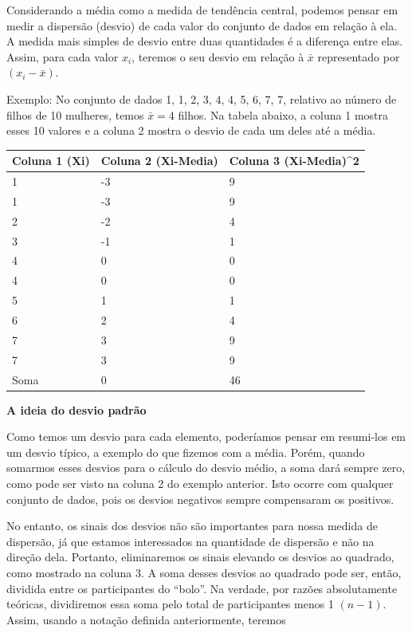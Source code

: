 \documentclass[
]{book}
\begin{document}
Considerando a média como a medida de tendência central, podemos pensar em medir a dispersão (desvio) de cada valor do conjunto de dados em relação à ela. A medida mais simples de desvio entre duas quantidades é a diferença entre elas. Assim, para cada valor \(x_i\), teremos o seu desvio em relação à \(\bar x\) representado por \((x_i-\bar x)\).

Exemplo: No conjunto de dados 1, 1, 2, 3, 4, 4, 5, 6, 7, 7, relativo ao número de filhos de 10 mulheres, temos \(\bar x = 4\) filhos. Na tabela abaixo, a coluna 1 mostra esses 10 valores e a coluna 2 mostra o desvio de cada um deles até a média.

\begin{tabular}{l|l|l}
\hline
Coluna 1 (Xi) & Coluna 2 (Xi-Media) & Coluna 3 (Xi-Media)\textasciicircum{}2\\
\hline
1 & -3 & 9\\
\hline
1 & -3 & 9\\
\hline
2 & -2 & 4\\
\hline
3 & -1 & 1\\
\hline
4 & 0 & 0\\
\hline
4 & 0 & 0\\
\hline
5 & 1 & 1\\
\hline
6 & 2 & 4\\
\hline
7 & 3 & 9\\
\hline
7 & 3 & 9\\
\hline
Soma & 0 & 46\\
\hline
\end{tabular}

\textbf{A ideia do desvio padrão}

Como temos um desvio para cada elemento, poderíamos pensar em resumi-los em um desvio típico, a exemplo do que fizemos com a média. Porém, quando somarmos esses desvios para o cálculo do desvio médio, a soma dará sempre zero, como pode ser visto na coluna 2 do exemplo anterior. Isto ocorre com qualquer conjunto de dados, pois os desvios negativos sempre compensaram os positivos.

No entanto, os sinais dos desvios não são importantes para nossa medida de dispersão, já que estamos interessados na quantidade de dispersão e não na direção dela. Portanto, eliminaremos os sinais elevando os desvios ao quadrado, como mostrado na coluna 3. A soma desses desvios ao quadrado pode ser, então, dividida entre os participantes do ``bolo''. Na verdade, por razões absolutamente teóricas, dividiremos essa soma pelo total de participantes menos 1 \((n-1)\). Assim, usando a notação definida anteriormente, teremos
\end{document}

